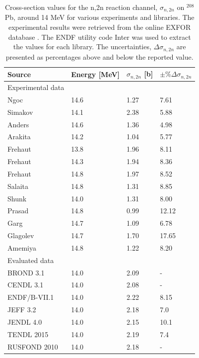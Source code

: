 \begin{table}[H]
  \footnotesize
  \centering
  \begin{tabularx}{\textwidth}{XXXX}
    \toprule
    Source & Energy [MeV] & $\sigma_{n,2n}$ [b] & $\pm\%\Delta\sigma_{n,2n}$ \\
    \midrule
    Experimental data &      &      &    \\
    \midrule
    Ngoc & 14.6 & 1.27 & 7.61 \\
    Simakov & 14.1 & 2.38 & 5.88 \\
    Anders & 14.6 & 1.36 & 4.98 \\
    Arakita & 14.2 & 1.04 & 5.77 \\
    Frehaut & 13.8 & 1.96 & 8.11 \\
    Frehaut & 14.3 & 1.94 & 8.36 \\
    Frehaut & 14.8 & 1.97 & 8.52 \\
    Salaita & 14.8 & 1.31 & 8.85 \\
    Shunk & 14.0 & 1.31 & 8.00 \\
    Prasad & 14.8 & 0.99 & 12.12 \\
    Garg & 14.7 & 1.09 & 6.78 \\
    Glagolev & 14.7 & 1.70 & 17.65 \\
    Amemiya & 14.8 & 1.22 & 8.20 \\
    \midrule
    Evaluated data &      &      &    \\
    \midrule
    BROND 3.1 & 14.0 & 2.09 & - \\
    CENDL 3.1 & 14.0 & 2.08 & - \\
    ENDF/B-VII.1 & 14.0 & 2.22 & 8.15 \\
    JEFF 3.2 & 14.0 & 2.18 & 7.0 \\
    JENDL 4.0 & 14.0 & 2.15 & 10.1 \\
    TENDL 2015 & 14.0 & 2.19 & 7.4 \\
    RUSFOND 2010 & 14.0 & 2.18 & - \\
    \bottomrule
  \end{tabularx}
  \caption[Cross-section and uncertainty data for the $^{208}$Pb(n,2n)$^{207}$Pb reaction.]{Cross-section values for the n,2n reaction channel, $\sigma_{n,2n}$ on $^{208}$Pb, around 14 MeV for various experiments and libraries. The experimental results were retrieved from the online EXFOR database \cite{exfor2017}. The ENDF utility code Inter \cite{Dunford2002} was used to extract the values for each library. The uncertainties, $\Delta\sigma_{n,2n}$ are presented as percentages above and below the reported value.}
  \label{tab:lead_by_lib}
\end{table}

